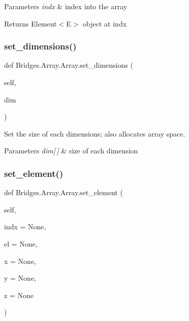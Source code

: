 \begin{DoxyParams}{Parameters}
{\em indx} & index into the array \\
\hline
\end{DoxyParams}
\begin{DoxyReturn}{Returns}
Element$<$\+E$>$ object at \textquotesingle{}indx\textquotesingle{} 
\end{DoxyReturn}
\mbox{\label{class_bridges_1_1_array_1_1_array_a496265932c2d4eeefd3605210afb93f9}} 
\subsubsection{\texorpdfstring{set\+\_\+dimensions()}{set\_dimensions()}}
{\footnotesize\ttfamily def Bridges.\+Array.\+Array.\+set\+\_\+dimensions (\begin{DoxyParamCaption}\item[{}]{self,  }\item[{}]{dim }\end{DoxyParamCaption})}



Set the size of each dimensions; also allocates array space. 


\begin{DoxyParams}{Parameters}
{\em dim\mbox{[}$\,$\mbox{]}} & size of each dimension \\
\hline
\end{DoxyParams}
\mbox{\label{class_bridges_1_1_array_1_1_array_a8a8ed85d66efca1049351abab01ab9c3}} 
\subsubsection{\texorpdfstring{set\+\_\+element()}{set\_element()}}
{\footnotesize\ttfamily def Bridges.\+Array.\+Array.\+set\+\_\+element (\begin{DoxyParamCaption}\item[{}]{self,  }\item[{}]{indx = {\ttfamily None},  }\item[{}]{el = {\ttfamily None},  }\item[{}]{x = {\ttfamily None},  }\item[{}]{y = {\ttfamily None},  }\item[{}]{z = {\ttfamily None} }\end{DoxyParamCaption})}

